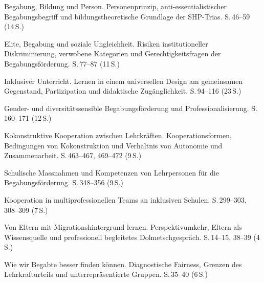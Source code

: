 \documentclass[ngerman, a4paper]{article}
\begin{document}
\begin{litdesc}
  \item[\cite{weigand2021person}] Begabung, Bildung und Person.
    Personenprinzip, anti-essentialistischer Begabungsbegriff und
    bildungstheoretische Grundlage der SHP-Trias. S.\,46--59 (14\,S.)
  \item[\cite{horvath2021elite}] Elite, Begabung und soziale Ungleichheit.
    Risiken institutioneller Diskriminierung, verwobene Kategorien und
    Gerechtigkeitsfragen der Begabungsförderung. S.\,77--87 (11\,S.)
  \item[\cite{muellerboeschschaffnermenn2021udl}] Inklusiver Unterricht.
    Lernen in einem universellen Design am gemeinsamen Gegenstand,
    Partizipation und didaktische Zugänglichkeit. S.\,94--116 (23\,S.)
  \item[\cite{macha2019gender}] Gender- und diversitätssensible
    Begabungsförderung und Professionalisierung. S.\,160--171 (12\,S.)
  \item[\cite{groschefussangelgraesel2020kokonstruktion}] Kokonstruktive
    Kooperation zwischen Lehrkräften. Kooperationsformen, Bedingungen von
    Kokonstruktion und Verhältnis von Autonomie und Zusammenarbeit.
    S.\,463--467, 469--472 (9\,S.)
  \item[\cite{nguyensliwka2021massnahmen}] Schulische Massnahmen und
    Kompetenzen von Lehrpersonen für die Begabungsförderung.
    S.\,348--356 (9\,S.)
  \item[\cite{widmerwolf2018multiprofessionell}] Kooperation in
    multiprofessionellen Teams an inklusiven Schulen.
    S.\,299--303, 308--309 (7\,S.)
  \item[\cite{kosoroklabhart2021voneltern}] Von Eltern mit
    Migrationshintergrund lernen. Perspektivumkehr, Eltern als
    Wissensquelle und professionell begleitetes Dolmetschgespräch.
    S.\,14--15, 38--39 (4\,S.)
  \item[\cite{baudson2025besserfinden}] Wie wir Begabte besser finden
    können. Diagnostische Fairness, Grenzen des Lehrkrafturteils und
    unterrepräsentierte Gruppen. S.\,35--40 (6\,S.)
\end{litdesc}
\end{document}
